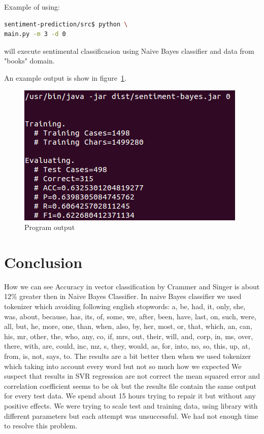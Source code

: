 \documentclass[10pt, a4paper]{article}
\begin{document}
Example of using:

\begin{lstlisting}[language=bash]
sentiment-prediction/src$ python \
main.py -m 3 -d 0
\end{lstlisting}

will execute sentimental classificasion using Naive Bayes classifier and data from "books" domain.

An example output is show in figure~\ref{fig:output}.

\begin{figure}[ht]
\begin{center}
\includegraphics[width=\columnwidth]{output}
\caption{Program output}
\label{fig:output}
\end{center}
\end{figure}

\section{Conclusion}

How we can see Accuracy in vector classification by Crammer and Singer is about 12\% greater then in Naive Bayes Classifier. In naive Bayes classifier we used tokenizer which avoiding following english stopwords: a, be, had, it, only, she, was, about, because, has, its, of, some, we, after, been, have, last, on, such, were, all, but, he, more, one, than, when, also, by, her, most, or, that, which, an, can, his, mr, other, the, who, any, co, if, mrs, out, their, will, and, corp, in, ms, over, there, with, are, could, inc, mz, s, they, would, as, for, into, no, so, this, up, at, from, is, not, says, to. The results are a bit better then when we used tokenizer which taking into account every word but not so much how we expected
We suspect that results in SVR regression are not correct
the mean squared error and correlation coefficient seems to be ok but the results file contain the same output for every test data. We spend about 15 hours trying to repair it but without any positive effects. We were trying to scale test and training data, using  library with different parameters but each attempt was unsuccessful. We had not enough time to resolve this problem.
\end{document}
